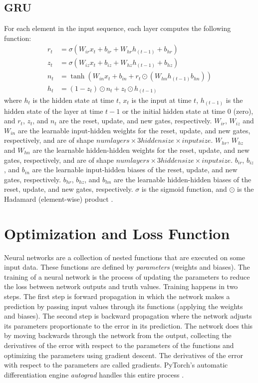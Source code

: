 \subsection{GRU}
For each element in the input sequence, each layer computes the following function:
\begin{align}
	r_{t} &= \sigma\left(W_{ir}x_{t} + b_{ir} + W_{hr}h_{\left(t-1\right)} + b_{hr}\right) \label{eq:GRU1} \\
	z_{t} &= \sigma\left(W_{iz}x_{t} + b_{iz} + W_{hz}h_{\left(t-1\right)} + b_{hz}\right) \label{eq:GRU2} \\
	n_{t} &= \tanh\left(W_{in}x_{t} + b_{in} + r_{t} \odot \left(W_{hn}h_{\left(t-1\right)} b_{hn}\right)\right) \label{eq:GRU3} \\
	h_{t} &= \left(1 - z_{t}\right) \odot n_{t} + z_{t} \odot h_{\left(t-1\right)} \label{eq:GRU4}
\end{align}
where $h_{t}$ is the hidden state at time $t$, $x_{t}$ is the input at time $t$, $h_{\left(t-1\right)}$ is the hidden state of the layer at time $t-1$ or the initial hidden state at time 0 (zero), and $r_{t}$, $z_{t}$, and $n_{t}$ are the reset, update, and new gates, respectively. $W_{ir}$, $W_{iz}$ and $W_{in}$ are the learnable input-hidden weights for the reset, update, and new gates, respectively, and are of shape $numlayers \times 3hiddensize \times inputsize$. $W_{hr}$, $W_{hz}$ and $W_{hn}$ are the learnable hidden-hidden weights for the reset, update, and new gates, respectively, and are of shape $numlayers \times 3hiddensize \times inputsize$. $b_{ir}$, $b_{iz}$, and $b_{in}$ are the learnable input-hidden biases of the reset, update, and new gates, respectively. $b_{hr}$, $b_{hz}$, and $b_{hn}$ are the learnable hidden-hidden biases of the reset, update, and new gates, respectively. $\sigma$ is the sigmoid function, and $\odot$ is the Hadamard (element-wise) product \cite{NEURIPS2019_9015}. 

\section{Optimization and Loss Function}
Neural networks are a collection of nested functions that are executed on some input data. These functions are defined by \emph{parameters} (weights and biases). The training of a neural network is the process of updating the parameters to reduce the loss between network outputs and truth values. Training happens in two steps. The first step is forward propagation in which the network makes a prediction by passing input values through its functions (applying the weights and biases). The second step is backward propagation where the network adjusts its parameters proportionate to the error in its prediction. The network does this by moving backwards through the network from the output, collecting the derivatives of the error with respect to the parameters of the functions and optimizing the parameters using gradient descent. The derivatives of the error with respect to the parameters are called gradients. PyTorch's automatic differentiation engine \textit{autograd} handles this entire process \cite{NEURIPS2019_9015}.

